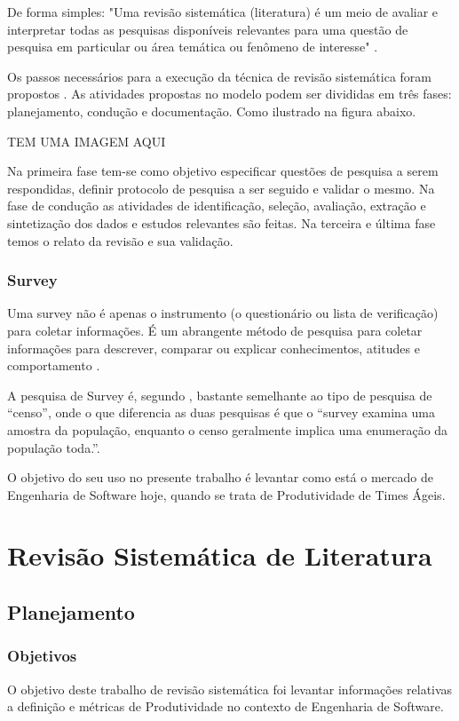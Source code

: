 De forma simples: "Uma revisão sistemática (literatura) é um meio de avaliar e interpretar todas as pesquisas
disponíveis relevantes para uma questão de pesquisa em particular ou área temática ou fenômeno de
interesse" \cite{Kitchenham04}.

Os passos necessários para a execução da técnica de revisão sistemática foram
propostos \cite{Brereton:2007:LAS:1225950.1226109}. As atividades propostas no modelo podem ser divididas em três fases:
planejamento, condução e documentação. Como ilustrado na figura abaixo.

TEM UMA IMAGEM AQUI

Na primeira fase tem-se como objetivo especificar questões de pesquisa a serem respondidas,
definir protocolo de pesquisa a ser seguido e validar o mesmo. Na fase de condução as atividades de
identificação, seleção, avaliação, extração e sintetização dos dados e estudos relevantes são feitas.
Na terceira e última fase temos o relato da revisão e sua validação.

\subsubsection{Survey}
Uma survey não é apenas o instrumento (o questionário ou lista de verificação)
para coletar informações. É um abrangente método de pesquisa para coletar
informações para descrever, comparar ou explicar conhecimentos, atitudes e comportamento \cite{fink}.

A pesquisa de Survey é, segundo \cite{babbie}, bastante semelhante ao tipo
de pesquisa de “censo”, onde o que diferencia as duas pesquisas é que o
“survey examina uma amostra da população, enquanto o censo geralmente implica
uma enumeração da população toda.”.

O objetivo do seu uso no presente trabalho é levantar como está o mercado de
Engenharia de Software hoje, quando se trata de Produtividade de Times Ágeis.

\section{Revisão Sistemática de Literatura}
\subsection{Planejamento}
\subsubsection{Objetivos}
O objetivo deste trabalho de revisão sistemática foi levantar informações relativas
a definição e métricas de Produtividade no contexto de
Engenharia de Software.

